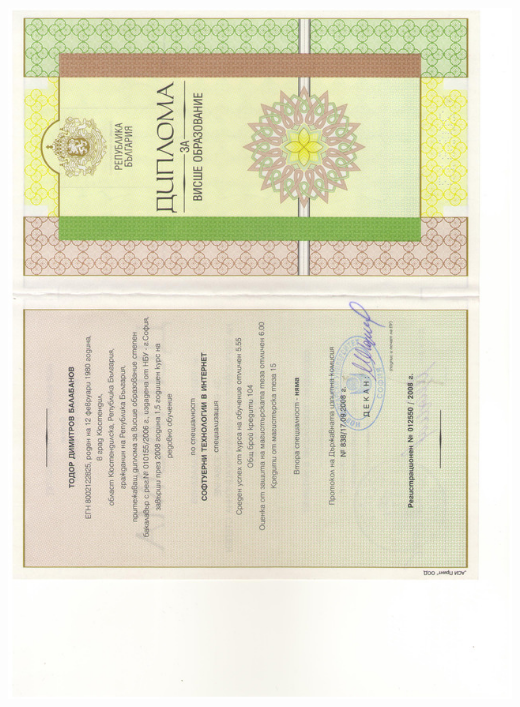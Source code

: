 \documentclass[bulgarian,a4paper]{europasscv}
\begin{document}
\includegraphics[width=\textwidth,height=\textheight,keepaspectratio]{DiplomaNBU2008_1}
\end{document}
